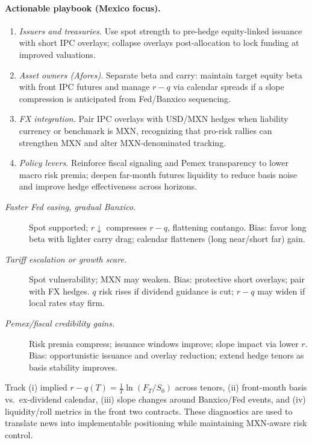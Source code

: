 \documentclass[11pt,a4paper]{article} %
\begin{document}
\paragraph{Actionable playbook (Mexico focus).}
\begin{enumerate}
  \item \textit{Issuers and treasuries.} Use spot strength to pre-hedge equity-linked issuance with short IPC overlays; collapse overlays post-allocation to lock funding at improved valuations.
  \item \textit{Asset owners (Afores).} Separate beta and carry: maintain target equity beta with front IPC futures and manage \(r-q\) via calendar spreads if a slope compression is anticipated from Fed/Banxico sequencing.
  \item \textit{FX integration.} Pair IPC overlays with USD/MXN hedges when liability currency or benchmark is MXN, recognizing that pro-risk rallies can strengthen MXN and alter MXN-denominated tracking.
  \item \textit{Policy levers.} Reinforce fiscal signaling and Pemex transparency to lower macro risk premia; deepen far-month futures liquidity to reduce basis noise and improve hedge effectiveness across horizons.
\end{enumerate}


\begin{description}
  \item[\textit{Faster Fed easing, gradual Banxico.}] Spot supported; \(r\downarrow\) compresses \(r-q\), flattening contango. Bias: favor long beta with lighter carry drag; calendar flatteners (long near/short far) gain.
  \item[\textit{Tariff escalation or growth scare.}] Spot vulnerability; MXN may weaken. Bias: protective short overlays; pair with FX hedges. \(q\) risk rises if dividend guidance is cut; \(r-q\) may widen if local rates stay firm.
  \item[\textit{Pemex/fiscal credibility gains.}] Risk premia compress; issuance windows improve; slope impact via lower \(r\). Bias: opportunistic issuance and overlay reduction; extend hedge tenors as basis stability improves.
\end{description}


Track (i) implied \(r-q(T)=\frac{1}{T}\ln(F_T/S_0)\) across tenors, (ii) front-month basis vs.\ ex-dividend calendar, (iii) slope changes around Banxico/Fed events, and (iv) liquidity/roll metrics in the front two contracts. These diagnostics are used to translate news into implementable positioning while maintaining MXN-aware risk control.
\end{document}
